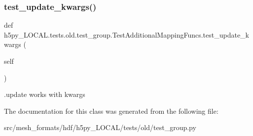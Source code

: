 \subsubsection{\texorpdfstring{test\+\_\+update\+\_\+kwargs()}{test\_update\_kwargs()}}
{\footnotesize\ttfamily def h5py\+\_\+\+L\+O\+C\+A\+L.\+tests.\+old.\+test\+\_\+group.\+Test\+Additional\+Mapping\+Funcs.\+test\+\_\+update\+\_\+kwargs (\begin{DoxyParamCaption}\item[{}]{self }\end{DoxyParamCaption})}

\begin{DoxyVerb}.update works with kwargs\end{DoxyVerb}
 

The documentation for this class was generated from the following file\+:\begin{DoxyCompactItemize}
\item 
src/mesh\+\_\+formats/hdf/h5py\+\_\+\+L\+O\+C\+A\+L/tests/old/test\+\_\+group.\+py\end{DoxyCompactItemize}
